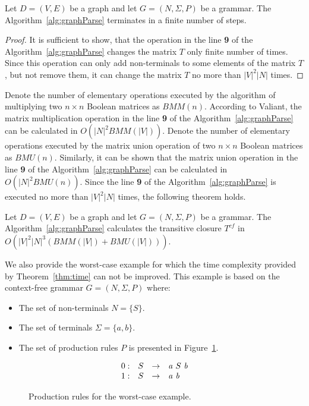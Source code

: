 \begin{mytheorem}\label{thm:finite}
 Let $D = (V,E)$ be a graph and let $G =(N,\Sigma,P)$ be a grammar. The Algorithm~\ref{alg:graphParse} terminates in a finite number of steps. 
\end{mytheorem}
\begin{proof}
It is sufficient to show, that the operation in the line \textbf{9} of the Algorithm~\ref{alg:graphParse} changes the matrix $T$ only finite number of times. Since this operation can only add non-terminals to some elements of the matrix $T$, but not remove them, it can change the matrix $T$ no more than $|V|^2|N|$ times.
\end{proof}

Denote the number of elementary operations executed by the algorithm of multiplying two $n \times n$ Boolean matrices as $BMM(n)$. According to Valiant, the matrix multiplication operation in the line \textbf{9} of the Algorithm~\ref{alg:graphParse} can be calculated in $O(|N|^2 BMM(|V|))$. Denote the number of elementary operations executed by the matrix union operation of two $n \times n$ Boolean matrices as $BMU(n)$. Similarly, it can be shown that the matrix union operation in the line \textbf{9} of the Algorithm~\ref{alg:graphParse} can be calculated in $O(|N|^2 BMU(n))$. Since the line \textbf{9} of the Algorithm~\ref{alg:graphParse} is executed no more than $|V|^2|N|$ times, the following theorem holds.

\begin{mytheorem}\label{thm:time}
 Let $D = (V,E)$ be a graph and let $G =(N,\Sigma,P)$ be a grammar. The Algorithm~\ref{alg:graphParse} calculates the transitive closure $T^{cf}$ in $O(|V|^2|N|^3(BMM(|V|) + BMU(|V|)))$.
\end{mytheorem}

We also provide the worst-case example for which the time complexity provided by Theorem~\ref{thm:time} can not be improved. This example is based on the context-free grammar $G = (N, \Sigma, P)$ where:
\begin{itemize}
	\item The set of non-terminals $N = \{S\}$.
	\item The set of terminals $\Sigma = \{a, b\}.$
	\item The set of production rules $P$ is presented in Figure~\ref{ProductionRulesWorsCaseExample}.
\end{itemize}

\begin{figure}[h]
	\[
	\begin{array}{rccl}
	0: & S & \rightarrow & \text{\textit{a}} \ S \ \text{\textit{b}} \\
	1: & S & \rightarrow & \text{\textit{a}} \ \text{\textit{b}} \\ 
	\end{array}
	\]
	\caption{Production rules for the worst-case example.}
	\label{ProductionRulesWorsCaseExample}
\end{figure}

